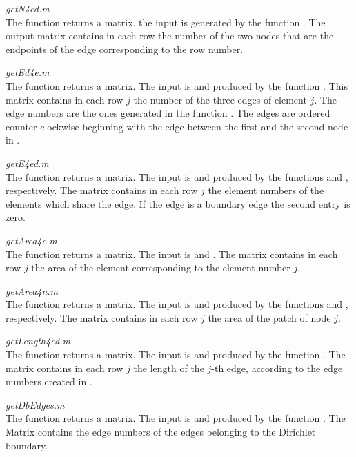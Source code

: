 \noindent\emph{getN4ed.m}\smallskip\\
The function  returns a \code{[nrEdges 2]} matrix. the input is  generated by the function . The output matrix contains in each row the number of the two nodes that are the endpoints of the edge corresponding to the row number.\bigskip


\noindent\emph{getEd4e.m}\smallskip\\
The function  returns a \code{[nrElems 3]} matrix. The input is  and  produced by the function . This matrix contains in each row $j$ the number of the three edges of element $j$. The edge numbers are the ones generated in the function . The edges are ordered counter clockwise beginning with the edge between the first and the second node in .\bigskip


\noindent\emph{getE4ed.m}\smallskip\\
The function  returns a \code{[nrEdges 2]} matrix. The input is  and  produced by the functions  and , respectively. The matrix contains in each row $j$ the element numbers of the elements which share the edge. If the edge is a boundary edge the second entry is zero.\bigskip


\noindent\emph{getArea4e.m}\smallskip\\
The function  returns a \code{[nrElems 1]} matrix. The input is  and . The matrix contains in each row $j$ the area of the element corresponding to the element number $j$.\bigskip


\noindent\emph{getArea4n.m}\smallskip\\
The function  returns a \code{[nrNodes 1]} matrix. The input is  and  produced by the functions  and , respectively. The matrix contains in each row $j$ the area of the patch of node $j$.\bigskip


\noindent\emph{getLength4ed.m}\smallskip\\
The function  returns a \code{[nrEdges 1]} matrix. The input is  and  produced by the function . The matrix contains in each row $j$ the length of the $j$-th edge, according to the edge numbers created in .\bigskip


\noindent\emph{getDbEdges.m}\smallskip\\
The function  returns a \code{[nrDbEdges 1]} matrix. The input is  and  produced by the function . The Matrix contains the edge numbers of the edges belonging to the Dirichlet boundary.\bigskip


